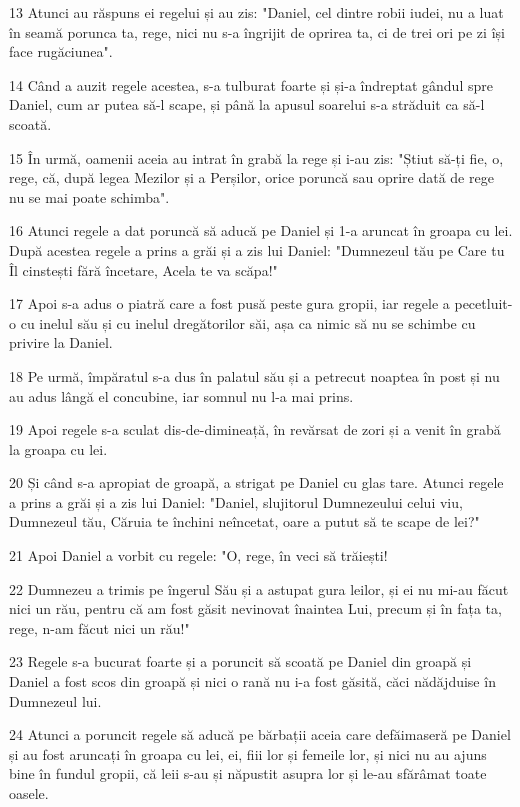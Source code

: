 \par 13 Atunci au răspuns ei regelui și au zis: "Daniel, cel dintre robii iudei, nu a luat în seamă porunca ta, rege, nici nu s-a îngrijit de oprirea ta, ci de trei ori pe zi își face rugăciunea".
\par 14 Când a auzit regele acestea, s-a tulburat foarte și și-a îndreptat gândul spre Daniel, cum ar putea să-l scape, și până la apusul soarelui s-a străduit ca să-l scoată.
\par 15 În urmă, oamenii aceia au intrat în grabă la rege și i-au zis: "Știut să-ți fie, o, rege, că, după legea Mezilor și a Perșilor, orice poruncă sau oprire dată de rege nu se mai poate schimba".
\par 16 Atunci regele a dat poruncă să aducă pe Daniel și 1-a aruncat în groapa cu lei. După acestea regele a prins a grăi și a zis lui Daniel: "Dumnezeul tău pe Care tu Îl cinstești fără încetare, Acela te va scăpa!"
\par 17 Apoi s-a adus o piatră care a fost pusă peste gura gropii, iar regele a pecetluit-o cu inelul său și cu inelul dregătorilor săi, așa ca nimic să nu se schimbe cu privire la Daniel.
\par 18 Pe urmă, împăratul s-a dus în palatul său și a petrecut noaptea în post și nu au adus lângă el concubine, iar somnul nu l-a mai prins.
\par 19 Apoi regele s-a sculat dis-de-dimineață, în revărsat de zori și a venit în grabă la groapa cu lei.
\par 20 Și când s-a apropiat de groapă, a strigat pe Daniel cu glas tare. Atunci regele a prins a grăi și a zis lui Daniel: "Daniel, slujitorul Dumnezeului celui viu, Dumnezeul tău, Căruia te închini neîncetat, oare a putut să te scape de lei?"
\par 21 Apoi Daniel a vorbit cu regele: "O, rege, în veci să trăiești!
\par 22 Dumnezeu a trimis pe îngerul Său și a astupat gura leilor, și ei nu mi-au făcut nici un rău, pentru că am fost găsit nevinovat înaintea Lui, precum și în fața ta, rege, n-am făcut nici un rău!"
\par 23 Regele s-a bucurat foarte și a poruncit să scoată pe Daniel din groapă și Daniel a fost scos din groapă și nici o rană nu i-a fost găsită, căci nădăjduise în Dumnezeul lui.
\par 24 Atunci a poruncit regele să aducă pe bărbații aceia care defăimaseră pe Daniel și au fost aruncați în groapa cu lei, ei, fiii lor și femeile lor, și nici nu au ajuns bine în fundul gropii, că leii s-au și năpustit asupra lor și le-au sfărâmat toate oasele.
